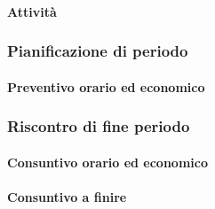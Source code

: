 \paragraph{Attività}


\subsubsection{Pianificazione di periodo}



\paragraph{Preventivo orario ed economico}



\subsubsection{Riscontro di fine periodo}


\paragraph{Consuntivo orario ed economico}


\paragraph{Consuntivo a finire}